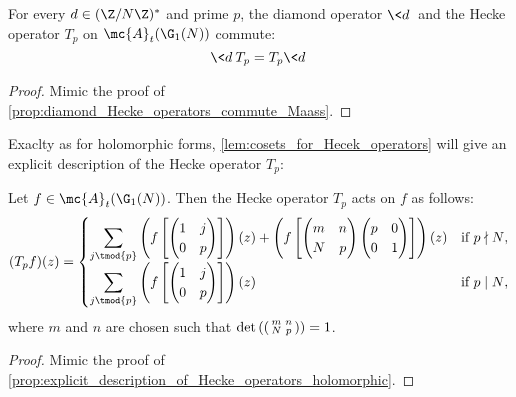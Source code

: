     \begin{proposition}\label{prop:diamond_Hecke_operators_commute_Maass}
      For every $d \in (\Z/N\Z)^{\ast}$ and prime $p$, the diamond operator $\<d\>$ and the Hecke operator $T_{p}$ on $\mc{A}_{t}(\G_{1}(N))$ commute:
      \[
        \<d\>T_{p} = T_{p}\<d\>
      \]
    \end{proposition}
    \begin{proof}
      Mimic the proof of \cref{prop:diamond_Hecke_operators_commute_Maass}.
    \end{proof}

    Exaclty as for holomorphic forms, \cref{lem:cosets_for_Hecek_operators} will give an explicit description of the Hecke operator $T_{p}$:

    \begin{proposition}\label{prop:explicit_description_of_Hecke_operators_Maass}
      Let $f \in \mc{A}_{t}(\G_{1}(N))$. Then the Hecke operator $T_{p}$ acts on $f$ as follows:
      \[
        (T_{p}f)(z) = \begin{cases} \displaystyle{\sum_{j \tmod{p}}}\left(f\left[\begin{pmatrix} 1 & j \\ 0 & p \end{pmatrix}\right]\right)(z)+\left(f\left[\begin{pmatrix} m & n \\ N & p \end{pmatrix}\begin{pmatrix} p & 0 \\ 0 & 1 \end{pmatrix}\right]\right)(z) & \text{if $p \nmid N$}, \\ \displaystyle{\sum_{j \tmod{p}}}\left(f\left[\begin{pmatrix} 1 & j \\ 0 & p \end{pmatrix}\right]\right)(z) & \text{if $p \mid N$}, \end{cases}
      \]
      where $m$ and $n$ are chosen such that $\det\left(\begin{psmallmatrix} m & n \\ N & p \end{psmallmatrix}\right) = 1$.
    \end{proposition}
    \begin{proof}
      Mimic the proof of \cref{prop:explicit_description_of_Hecke_operators_holomorphic}.
    \end{proof}

